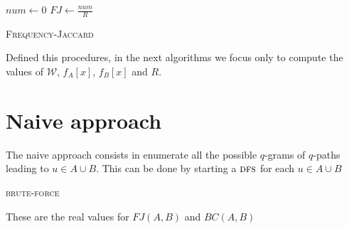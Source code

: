 \begin{algorithm}[h]
	\small
	\DontPrintSemicolon
	\BlankLine
	$num \gets 0$\;
	$FJ \gets \frac{num}{R}$\;
	\caption{\textsc{Frequency-Jaccard}}
	\label{alg:jaccard}
\end{algorithm}

Defined this procedures, in the next algorithms we focus only to compute the values of $\mathcal{W}$, $f_{A}[x]$, $f_{B}[x]$ and $R$.

\clearpage 

\section{Naive approach}

	The naive approach consists in enumerate all the possible $q$-grams of $q$-paths leading to $u \in A \cup B$. 
	This can be done by starting a $\textsc{dfs}$ for each $u \in A \cup B$
	
    \begin{algorithm}[h]
    
    \small
    \DontPrintSemicolon
    \Output{\ }
    
    \BlankLine
    
    

    
    \caption{\textsc{brute-force}}
    
    \label{alg:brute-force}
    \end{algorithm}

	These are the real values for $FJ(A,B)$ and $BC(A,B)$ 
	
